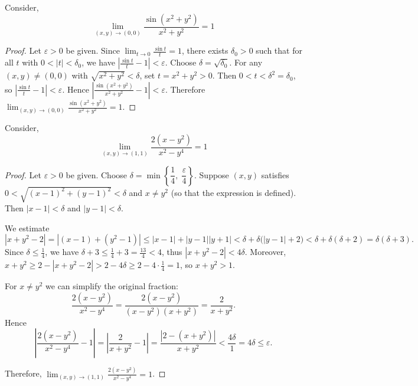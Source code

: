 \begin{example}
	Consider,
	$$
		\lim_{(x,y)\rightarrow (0,0)}\frac{\sin(x^2+y^2)}{x^2+y^2}=1
	$$
\end{example}

\begin{proof}
	Let \(\varepsilon > 0\) be given. Since \(\displaystyle \lim_{t \to 0} \frac{\sin t}{t} = 1\), there exists \(\delta_0 > 0\) such that for all \(t\) with \(0 < |t| < \delta_0\), we have \(\left| \frac{\sin t}{t} - 1 \right| < \varepsilon\). Choose \(\delta = \sqrt{\delta_0}\). For any \((x,y) \neq (0,0)\) with \(\sqrt{x^2+y^2} < \delta\), set \(t = x^2+y^2 > 0\). Then \(0 < t < \delta^2 = \delta_0\), so \(\left| \frac{\sin t}{t} - 1 \right| < \varepsilon\). Hence \(\left| \frac{\sin(x^2+y^2)}{x^2+y^2} - 1 \right| < \varepsilon\). Therefore \(\displaystyle \lim_{(x,y)\to(0,0)} \frac{\sin(x^2+y^2)}{x^2+y^2} = 1\).
\end{proof}
\begin{example}
	Consider,
	$$
		\lim_{(x,y)\rightarrow (1,1)}\frac{2(x-y^2)}{x^2-y^4}=1
	$$
\end{example}

\begin{proof}
	Let \(\varepsilon > 0\) be given. Choose \(\delta = \min\left\{\dfrac14,\;\dfrac{\varepsilon}{4}\right\}\).
	Suppose \((x,y)\) satisfies \(0 < \sqrt{(x-1)^2+(y-1)^2} < \delta\) and \(x \neq y^2\) (so that the expression is defined). Then \(|x-1| < \delta\) and \(|y-1| < \delta\).

	We estimate
	\[
		|x+y^2-2| = |(x-1)+(y^2-1)|
		\le |x-1| + |y-1||y+1|
		< \delta + \delta\bigl(|y-1|+2\bigr)
		< \delta + \delta(\delta+2) = \delta(\delta+3).
	\]
	Since \(\delta \le \frac14\), we have \(\delta+3 \le \frac14+3 = \frac{13}{4} < 4\), thus \(|x+y^2-2| < 4\delta\).
	Moreover, \(x+y^2 \ge 2 - |x+y^2-2| > 2 - 4\delta \ge 2 - 4\cdot\frac14 = 1\), so \(x+y^2 > 1\).

	For \(x \neq y^2\) we can simplify the original fraction:
	\[
		\frac{2(x-y^2)}{x^2-y^4} = \frac{2(x-y^2)}{(x-y^2)(x+y^2)} = \frac{2}{x+y^2}.
	\]
	Hence
	\[
		\left|\frac{2(x-y^2)}{x^2-y^4} - 1\right|
		= \left|\frac{2}{x+y^2} - 1\right|
		= \frac{|2 - (x+y^2)|}{x+y^2}
		< \frac{4\delta}{1} = 4\delta \le \varepsilon.
	\]

	Therefore, \(\displaystyle \lim_{(x,y)\to(1,1)}\frac{2(x-y^2)}{x^2-y^4}=1\).
\end{proof}
